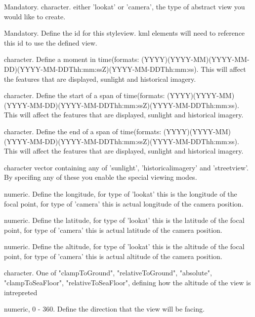 \documentclass[a4paper]{book}
\begin{document}
\begin{Arguments}
\begin{ldescription}

\item[\code{type}] 
Mandatory. character. either 'lookat' or 'camera', the type of abstract view you would like to create.    

\item[\code{viewid}] 
Mandatory. Define the id for this styleview. kml elements will need to reference this id to use the defined view. 

\item[\code{TimeStamp}] character. Define a moment in time(formats: (YYYY)(YYYY-MM)(YYYY-MM-DD)(YYYY-MM-DDThh:mm:ssZ)(YYYY-MM-DDThh:mm:ss). This will affect the features that are displayed, sunlight and historical imagery.
\item[\code{TimeSpanStart}] character. Define the start of a span of time(formats: (YYYY)(YYYY-MM)(YYYY-MM-DD)(YYYY-MM-DDThh:mm:ssZ)(YYYY-MM-DDThh:mm:ss). This will affect the features that are displayed, sunlight and historical imagery.
\item[\code{TimeSpanEnd}] character. Define the end of a span of time(formats: (YYYY)(YYYY-MM)(YYYY-MM-DD)(YYYY-MM-DDThh:mm:ssZ)(YYYY-MM-DDThh:mm:ss). This will affect the features that are displayed, sunlight and historical imagery.

\item[\code{ViewerOptions}] character vector containing any of 'sunlight', 'historicalimagery' and 'streetview'. By specifing any of these you enable the special viewing modes. 

\item[\code{longitude}] numeric. Define the longitude, for type of 'lookat' this is the longitude of the focal point, for type of 'camera' this is actual longitude of the camera position.

\item[\code{latitude}] numeric. Define the latitude, for type of 'lookat' this is the latitude of the focal point, for type of 'camera' this is actual latitude of the camera position.
\item[\code{altitude}] numeric. Define the altitude, for type of 'lookat' this is the altitude of the focal point, for type of 'camera' this is actual altitude of the camera position.
\item[\code{altitudeMode}] character. One of "clampToGround", "relativeToGround", "absolute", "clampToSeaFloor", "relativeToSeaFloor", defining how the altitude of the view is intrepreted 
\item[\code{heading}] numeric, 0 - 360. Define the direction that the view will be facing.


\end{ldescription}
\end{Arguments}
\end{document}
